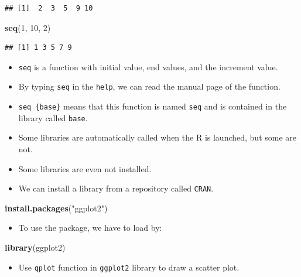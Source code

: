 \documentclass[]{book}
\newenvironment{Shaded}{\begin{snugshade}}{\end{snugshade}}
\newcommand{\KeywordTok}[1]{\textcolor[rgb]{0.13,0.29,0.53}{\textbf{#1}}}
\newcommand{\DecValTok}[1]{\textcolor[rgb]{0.00,0.00,0.81}{#1}}
\newcommand{\StringTok}[1]{\textcolor[rgb]{0.31,0.60,0.02}{#1}}
\newcommand{\NormalTok}[1]{#1}
\providecommand{\tightlist}{%
  \setlength{\itemsep}{0pt}\setlength{\parskip}{0pt}}
\theoremstyle{definition}
\theoremstyle{definition}
\theoremstyle{definition}
\theoremstyle{remark}
\begin{document}
\begin{verbatim}
## [1]  2  3  5  9 10
\end{verbatim}

\begin{Shaded}
\begin{Highlighting}[]
\KeywordTok{seq}\NormalTok{(}\DecValTok{1}\NormalTok{, }\DecValTok{10}\NormalTok{, }\DecValTok{2}\NormalTok{)}
\end{Highlighting}
\end{Shaded}

\begin{verbatim}
## [1] 1 3 5 7 9
\end{verbatim}

\begin{itemize}
\tightlist
\item
  \texttt{seq} is a function with initial value, end values, and the
  increment value.
\item
  By typing \texttt{seq} in the \texttt{help}, we can read the manual
  page of the function.
\item
  \texttt{seq\ \{base\}} means that this function is named \texttt{seq}
  and is contained in the library called \texttt{base}.
\item
  Some libraries are automatically called when the R is launched, but
  some are not.
\item
  Some libraries are even not installed.
\item
  We can install a library from a repository called \texttt{CRAN}.
\end{itemize}

\begin{Shaded}
\begin{Highlighting}[]
\KeywordTok{install.packages}\NormalTok{(}\StringTok{"ggplot2"}\NormalTok{)}
\end{Highlighting}
\end{Shaded}

\begin{itemize}
\tightlist
\item
  To use the package, we have to load by:
\end{itemize}

\begin{Shaded}
\begin{Highlighting}[]
\KeywordTok{library}\NormalTok{(ggplot2)}
\end{Highlighting}
\end{Shaded}

\begin{itemize}
\tightlist
\item
  Use \texttt{qplot} function in \texttt{ggplot2} library to draw a
  scatter plot.
\end{itemize}
\end{document}
